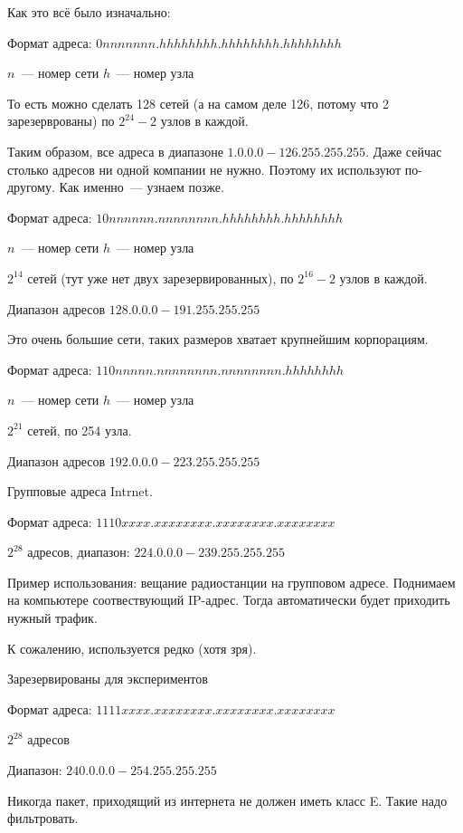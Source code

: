 Как это всё было изначально:


Формат адреса: $0nnnnnnn.hhhhhhhh.hhhhhhhh.hhhhhhhh$

$n$~--- номер сети
$h$~--- номер узла

То есть можно сделать 128 сетей (а на самом деле 126, потому что 2 зарезерврованы) по $2^{24}-2$ узлов в каждой.

Таким образом, все адреса в диапазоне $1.0.0.0-126.255.255.255$. Даже сейчас столько адресов ни одной компании не нужно. Поэтому их используют по-другому. Как именно~--- узнаем позже.


Формат адреса: $10nnnnnn.nnnnnnnn.hhhhhhhh.hhhhhhhh$

$n$~--- номер сети
$h$~--- номер узла

$2^{14}$ сетей (тут уже нет двух зарезервированных), по $2^{16}-2$ узлов в каждой.

Диапазон адресов $128.0.0.0-191.255.255.255$

Это очень большие сети, таких размеров хватает крупнейшим корпорациям.


Формат адреса: $110nnnnn.nnnnnnnn.nnnnnnnn.hhhhhhhh$

$n$~--- номер сети
$h$~--- номер узла

$2^{21}$ сетей, по 254 узла.

Диапазон адресов $192.0.0.0-223.255.255.255$


Групповые адреса Intrnet.

Формат адреса: $1110xxxx.xxxxxxxx.xxxxxxxx.xxxxxxxx$

$2^{28}$ адресов, диапазон: $224.0.0.0 - 239.255.255.255$

Пример использования: вещание радиостанции на групповом адресе. Поднимаем на компьютере соотвествующий IP-адрес. Тогда автоматически будет приходить нужный трафик.

К сожалению, используется редко (хотя зря).


Зарезервированы для экспериментов

Формат адреса: $1111xxxx.xxxxxxxx.xxxxxxxx.xxxxxxxx$

$2^{28}$ адресов

Диапазон: $240.0.0.0-254.255.255.255$

Никогда пакет, приходящий из интернета не должен иметь класс E. Такие надо фильтровать.

